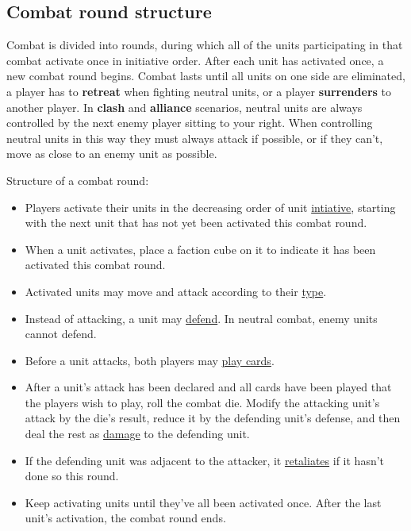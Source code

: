 \documentclass[12pt]{article}
\begin{document}
\subsection*{Combat round structure}
Combat is divided into rounds, during which all of the units participating in that combat activate once in initiative order. After each unit has activated once, a new combat round begins. Combat lasts until all units on one side are eliminated, a player has to \textbf{retreat} when fighting neutral units, or a player \textbf{surrenders} to another player. In \textbf{clash} and \textbf{alliance} scenarios, neutral units are always controlled by the next enemy player sitting to your right. When controlling neutral units in this way they must always attack if possible, or if they can't, move as close to an enemy unit as possible.\par
Structure of a combat round:
\begin{itemize}
    \item Players activate their units in the decreasing order of unit \hyperlink{Initiative}{intiative}, starting with the next unit that has not yet been activated this combat round.
    \item When a unit activates, place a faction cube on it to indicate it has been activated this combat round.
    \item Activated units may move and attack according to their \hyperlink{Unittype}{type}.
    \item Instead of attacking, a unit may \hyperlink{Defend}{defend}. In neutral combat, enemy units cannot defend.
    \item Before a unit attacks, both players may \hyperlink{CombatCards}{play cards}. %
    \item After a unit's attack has been declared and all cards have been played that the players wish to play, roll the combat die. Modify the attacking unit's attack by the die's result, reduce it by the defending unit's defense, and then deal the rest as \hyperlink{HP}{damage} to the defending unit.
    \item If the defending unit was adjacent to the attacker, it \hyperlink{Retaliate}{retaliates} if it hasn't done so this round.
    \item Keep activating units until they've all been activated once. After the last unit's activation, the combat round ends.
\end{itemize}
\end{document}
